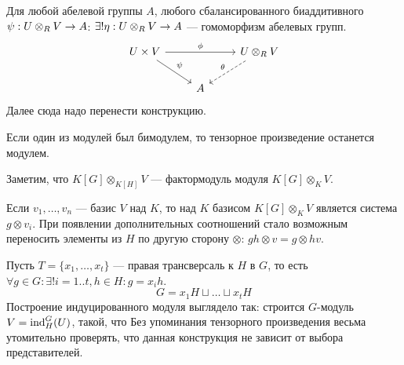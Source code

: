 Для любой абелевой группы $A$, любого сбалансированного биаддитивного $\psi: U \otimes_R V \rightarrow A$: $\exists! \eta : U \otimes_R V \rightarrow A$ --- гомоморфизм абелевых групп.
\[\begin{tikzcd}[ampersand replacement=\&]
{U \times V}
      \&\& {U \otimes_R V} \\
      \& A
      \arrow["\psi", from=1-1, to=2-2]
      \arrow["\phi", from=1-1, to=1-3]
      \arrow["\theta"', dashed, from=1-3, to=2-2]
\end{tikzcd}\]
Далее сюда надо перенести конструкцию.

Если один из модулей был бимодулем, то тензорное произведение останется модулем.

Заметим, что $K[G] \otimes_{K[H]} V$ --- фактормодуль модуля $K[G] \otimes_K V$.

Если $v_1, \dots, v_n$ --- базис $V$ над $K$, то над $K$ базисом $K[G] \otimes_K V$ является система $g \otimes v_i$.
При появлении дополнительных соотношений стало возможным переносить элементы из $H$ по другую сторону $\otimes$: $gh \otimes v = g \otimes hv$.

Пусть $T = \{x_1, \dots, x_t\}$ --- правая трансверсаль к $H$ в $G$, то есть $\forall g \in G: \exists! i = 1..t, h \in H: g = x_i h$.
\[G = x_1 H \sqcup \dots \sqcup x_t H\]
Построение индуцированного модуля выглядело так: строится $G$-модуль $V = \operatorname{ind}_H^G(U)$, такой, что
Без упоминания тензорного произведения весьма утомительно проверять, что данная конструкция не зависит от выбора представителей.


